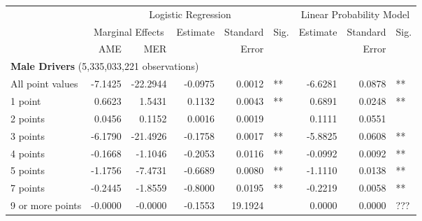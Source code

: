 
\begin{table}%
\centering 
\begin{tabular}{l r r r r l r r l} 

\hline 
 
 & \multicolumn{5}{c}{Logistic Regression}  & \multicolumn{3}{c}{Linear Probability Model} \\ 

 \cmidrule(lr){2-6}\cmidrule(lr){7-9} 
 & \multicolumn{2}{c}{Marginal Effects} & Estimate & Standard & Sig. & Estimate & Standard & Sig. \\ 

 \cmidrule(lr){2-3} 
 &   AME & MER &          &  Error   &      &          &  Error   &     \\ 

\hline 
 
\multicolumn{8}{l}{\textbf{Male Drivers} (5,335,033,221 observations)} \\ 

All point values                &  -7.1425        &  -22.2944       &  -0.0975        &  0.0012       &   **       &  -6.6281        &  0.0878       &   **       \\ 
1 point                         &  0.6623        &  1.5431       &  0.1132        &  0.0043       &   **       &  0.6891        &  0.0248       &   **       \\ 
2 points                        &  0.0456        &  0.1152       &  0.0016        &  0.0019       &            &  0.1111        &  0.0551       &            \\ 
3 points                        &  -6.1790        &  -21.4926       &  -0.1758        &  0.0017       &   **       &  -5.8825        &  0.0608       &   **       \\ 
4 points                        &  -0.1668        &  -1.1046       &  -0.2053        &  0.0116       &   **       &  -0.0992        &  0.0092       &   **       \\ 
5 points                        &  -1.1756        &  -7.4731       &  -0.6689        &  0.0080       &   **       &  -1.1110        &  0.0138       &   **       \\ 
7 points                        &  -0.2445        &  -1.8559       &  -0.8000        &  0.0195       &   **       &  -0.2219        &  0.0058       &   **       \\ 
9 or more points                &  -0.0000        &  -0.0000       &  -0.1553        &  19.1924       &            &  0.0000        &  0.0000       &  ???       \\ 


\end{tabular}
\end{table}
